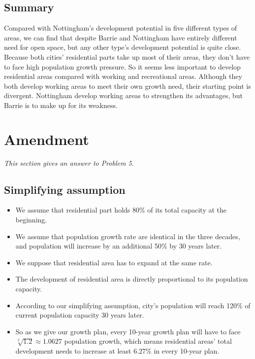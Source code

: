 \subsection{Summary}
Compared with Nottingham's development potential in five different types of areas, we can find that despite Barrie and Nottingham have entirely different need for open space, but any other type's development potential is quite close. Because both cities' residential parts take up most of their areas, they don't have to face high population growth pressure. So it seems less important to develop residential areas compared with working and recreational areas. Although they both develop working areas to meet their own growth need, their starting point is divergent. Nottingham develop working areas to strengthen its advantages, but Barrie is to make up for its weakness.


\section{Amendment}
\emph{This section gives an answer to Problem 5.}
\subsection{Simplifying assumption}
\begin{itemize}
  \item We assume that residential part holds 80\% of its total capacity at the beginning.
  \item We assume that population growth rate are identical in the three decades, and population will increase by an additional 50\% by 30 years later.
  \item We suppose that residential area has to expand at the same rate.
  \item The development of residential area is directly proportional to its population capacity.
  \item According to our simplifying assumption, city's population will reach 120\% of current population capacity 30 years later.
  \item So as we give our growth plan, every 10-year growth plan will have to face $\sqrt[3]{1.2} \approx 1.0627$ population growth, which means residential areas' total development needs to increase at least 6.27\% in every 10-year plan.
\end{itemize}

